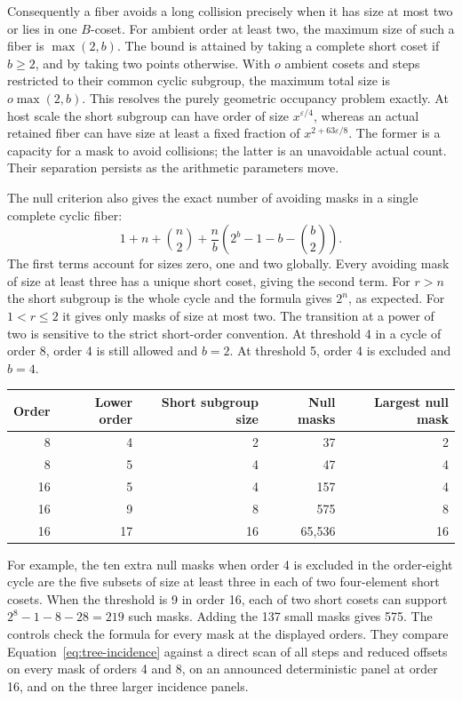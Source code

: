 \documentclass[12pt,letterpaper]{article}
\begin{document}
Consequently a fiber avoids a long collision precisely when it has size at most two or lies in one \(B\)-coset. For ambient order at least two, the maximum size of such a fiber is \(\max(2,b)\). The bound is attained by taking a complete short coset if \(b\ge2\), and by taking two points otherwise. With \(o\) ambient cosets and steps restricted to their common cyclic subgroup, the maximum total size is \(o\max(2,b)\). This resolves the purely geometric occupancy problem exactly. At host scale the short subgroup can have order of size \(x^{\varepsilon/4}\), whereas an actual retained fiber can have size at least a fixed fraction of \(x^{2+63\varepsilon/8}\). The former is a capacity for a mask to avoid collisions; the latter is an unavoidable actual count. Their separation persists as the arithmetic parameters move.

The null criterion also gives the exact number of avoiding masks in a single complete cyclic fiber:
\begin{equation}
   1+n+\binom n2+\frac nb\left(2^b-1-b-\binom b2\right).
   \label{eq:null-formula}
\end{equation}
The first terms account for sizes zero, one and two globally. Every avoiding mask of size at least three has a unique short coset, giving the second term. For \(r>n\) the short subgroup is the whole cycle and the formula gives \(2^n\), as expected. For \(1<r\le2\) it gives only masks of size at most two. The transition at a power of two is sensitive to the strict short-order convention. At threshold 4 in a cycle of order 8, order 4 is still allowed and \(b=2\). At threshold 5, order 4 is excluded and \(b=4\).

\begin{center}
\begin{tabular}{@{}rrrrr@{}}
\toprule
Order & Lower order & Short subgroup size & Null masks & Largest null mask\\
\midrule
8&4&2&37&2\\
8&5&4&47&4\\
16&5&4&157&4\\
16&9&8&575&8\\
16&17&16&65,536&16\\
\bottomrule
\end{tabular}
\end{center}

For example, the ten extra null masks when order 4 is excluded in the order-eight cycle are the five subsets of size at least three in each of two four-element short cosets. When the threshold is 9 in order 16, each of two short cosets can support \(2^8-1-8-28=219\) such masks. Adding the 137 small masks gives 575. The controls check the formula for every mask at the displayed orders. They compare Equation~\eqref{eq:tree-incidence} against a direct scan of all steps and reduced offsets on every mask of orders 4 and 8, on an announced deterministic panel at order 16, and on the three larger incidence panels.
\end{document}
